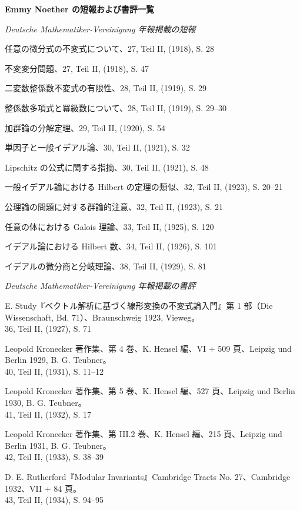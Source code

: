 \clearpage
\begin{center}
{\Large\bfseries Emmy Noether の短報および書評一覧}
\end{center}
\label{liste-der-kurzmitteilungen-und-buchbesprechungen-von-emmy-noether}

\begin{center}
\emph{Deutsche Mathematiker-Vereinigung 年報掲載の短報}
\end{center}

\begingroup
\setlength{\parindent}{0pt}
\setlength{\parskip}{0.15em}
任意の微分式の不変式について、27, Teil II, (1918), S. 28\par
不変変分問題、27, Teil II, (1918), S. 47\par
二変数整係数不変式の有限性、28, Teil II, (1919), S. 29\par
整係数多項式と冪級数について、28, Teil II, (1919), S. 29--30\par
加群論の分解定理、29, Teil II, (1920), S. 54\par
単因子と一般イデアル論、30, Teil II, (1921), S. 32\par
Lipschitz の公式に関する指摘、30, Teil II, (1921), S. 48\par
一般イデアル論における Hilbert の定理の類似、32, Teil II, (1923), S. 20--21\par
公理論の問題に対する群論的注意、32, Teil II, (1923), S. 21\par
任意の体における Galois 理論、33, Teil II, (1925), S. 120\par
イデアル論における Hilbert 数、34, Teil II, (1926), S. 101\par
イデアルの微分商と分岐理論、38, Teil II, (1929), S. 81\par
\endgroup

\begin{center}
\emph{Deutsche Mathematiker-Vereinigung 年報掲載の書評}
\end{center}

\begingroup
\setlength{\parindent}{0pt}
\setlength{\parskip}{0.35em}
E. Study『ベクトル解析に基づく線形変換の不変式論入門』第 1 部（Die Wissenschaft, Bd. 71）、Braunschweig 1923, Vieweg。\\
36, Teil II, (1927), S. 71\par
Leopold Kronecker 著作集、第 4 巻、K. Hensel 編、VI + 509 頁、Leipzig und Berlin 1929, B. G. Teubner。\\
40, Teil II, (1931), S. 11--12\par
Leopold Kronecker 著作集、第 5 巻、K. Hensel 編、527 頁、Leipzig und Berlin 1930, B. G. Teubner。\\
41, Teil II, (1932), S. 17\par
Leopold Kronecker 著作集、第 III.2 巻、K. Hensel 編、215 頁、Leipzig und Berlin 1931, B. G. Teubner。\\
42, Teil II, (1933), S. 38--39\par
D. E. Rutherford『Modular Invariants』Cambridge Tracts No. 27、Cambridge 1932、VII + 84 頁。\\
43, Teil II, (1934), S. 94--95\par
\endgroup

